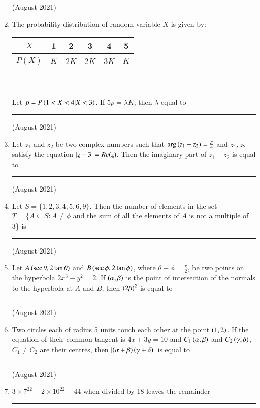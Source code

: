 \documentclass[journal]{IEEEtran}
\begin{document}
\begin{enumerate}
    \hfill (August-2021) 
    
    \item The probability distribution of random variable $X$ is given by: \\
    \begin{tabular}[12pt]{ |c| c| c|c|c|c|}
    \hline
    $X$ & 1 & 2 & 3 & 4 & 5 \\
    \hline
    $P(X)$ & $K$ & 2$K$ & 2$K$ & 3$K$ & $K$ \\
    \hline 
    \end{tabular} \\ \\
    Let $p = P \left(1 < X < 4 | X < 3\right)$. If $5p = \lambda K$, then $\lambda$ equal to \rule{1.5cm}{0.15mm} 
    
    \hfill(August-2021) 
    
    \item Let $z_1$ and $z_2$ be two complex numbers such that $\arg{\ensuremath{\left(z_1 - z_2\right)}} = \frac{\pi}{4}$ 
 and $z_1, z_2$ satisfy the equation $\left\vert z -
 3 \right\vert= Re(z)$. Then the imaginary part of $z_1 + z_2$ is equal to \rule{1cm}{0.15mm}
 
 \hfill(August-2021)
 
 \item Let $S = \{1, 2, 3, 4, 5, 6, 9\}$. Then the number of elements in the set $T = \{A\subseteq 
 S : A \neq \phi $ and the sum of all the elements of $A$ is not a multiple of 3\} is \rule{1cm}{0.15mm} 
 
     \hfill(August-2021)
     
    \item Let $A\left(\sec \theta, 2\tan \theta\right)$ and $B \left(\sec \phi, 2 \tan \phi\right)$, where $\theta + \phi = \frac{\pi}{2}$, be two points on the hyperbola $2x^3 - y^2 = 2$. If $\left(\alpha, \beta\right)$ is the point of intersection of the normals to the hyperbola at $A$ and $B$, then $\left(2\beta\right)^2$ is equal to \rule{1.5cm}{0.15mm}
    
    \hfill (August-2021)
    
    \item Two circles each of radius 5 units touch each other at the point $\left(1,2\right)$. If the equation of their common tangent is $4x + 3y = 10$ and $C_1 \left(\alpha,\beta\right)$ and $C_2 \left(\gamma, \delta\right)$, $C_1 \neq C_2$ are their centres, then $\left\vert\left(\alpha+\beta\right)\left(\gamma+\delta\right)\right\vert$
    is equal to \rule{1cm}{0.15mm}
    
    \hfill (August-2021)
    
    \item $3 \times 7^{22} + 2 \times 10^{22} - 44$ when divided by 18 leaves the remainder \rule{1cm}{0.15mm} 
    

\end{enumerate}
\end{document}
